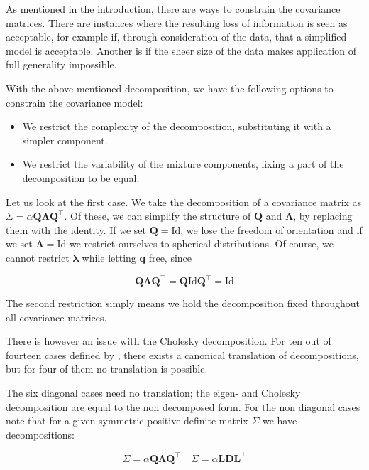 As mentioned in the introduction, there are ways to constrain the covariance 
matrices. There are instances where the resulting loss of information is seen 
as acceptable, for example if, through consideration of the data, that a 
simplified model is acceptable. Another is if the sheer size of the data makes 
application of full generality impossible.

With the above mentioned decomposition, we have the following options to 
constrain the covariance model:

\begin{itemize}
    \item We restrict the complexity of the decomposition, substituting it with 
        a simpler component.
    \item We restrict the variability of the mixture components, fixing a part 
        of the decomposition to be equal.
\end{itemize}

Let us look at the first case. We take the decomposition of a covariance matrix
as $\Sigma = \alpha \pmb{Q\Lambda Q}^\top$. Of these, we can simplify the 
structure of $\pmb{Q}$ and $\pmb{\Lambda}$, by replacing them with the identity.
If we set $\pmb{Q}=\mathrm{Id}$, we lose the freedom of orientation and if we 
set $\pmb{\Lambda}=\mathrm{Id}$ we restrict ourselves to spherical 
distributions. Of course, we cannot restrict $\pmb{\lambda}$ while letting 
$\pmb{q}$ free, since

\begin{equation} 
    \pmb{Q\Lambda Q}^\top = \pmb{Q}\mathrm{Id}\pmb{Q}^\top = \mathrm{Id}
\end{equation}

The second restriction simply means we hold the decomposition fixed throughout 
all covariance matrices.

There is however an issue with the Cholesky decomposition. For ten out of 
fourteen cases defined by \cite{Cel95}, there exists a canonical translation of
decompositions, but for four of them no translation is possible.

The six diagonal cases need no translation; the eigen- and Cholesky 
decomposition are equal to the non decomposed form. For the non diagonal cases 
note that for a given symmetric positive definite matrix $\Sigma$ we have 
decompositions:

\begin{equation}
    \Sigma = \alpha \pmb{Q \Lambda Q}^\top \quad \Sigma =\alpha \pmb{L D L}^\top
\end{equation}

